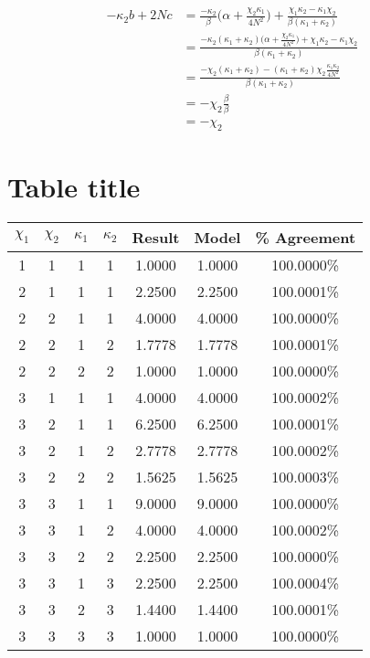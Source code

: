 \documentclass[11pt,a4paper]{article}
\numberwithin{equation}{section}
\begin{document}
\begin{appendices}
	\begin{align*}
	-\kappa_2 b + 2Nc &= \frac{-\kappa_2}{\beta} \Big(\alpha + \frac{\chi_2 \kappa_1}{4N^2} \Big) + \frac{\chi_1 \kappa_2 - \kappa_1 \chi_2}{\beta (\kappa_1+\kappa_2)}&\\
	&= \frac{-\kappa_2 (\kappa_1+\kappa_2) \Big(\alpha + \frac{\chi_2 \kappa_1}{4N^2} \Big) + \chi_1 \kappa_2 - \kappa_1 \chi_2}{\beta (\kappa_1+\kappa_2)}&\\
	&= \frac{-\chi_2(\kappa_1+\kappa_2)- (\kappa_1+\kappa_2)\chi_2 \frac{\kappa_1 \kappa_2}{4N^2}}{\beta (\kappa_1+\kappa_2)}&\\
	&= -\chi_2 \frac{\beta}{\beta}&\\
	&= - \chi_2&
	\end{align*}
	
	\section{Table title} 
	\begin{center}
		\begin{tabular}{cccc|cc|c}
			$\chi_1$ & $\chi_2$ & $\kappa_1$ & $\kappa_2$ & Result & Model & \% Agreement \\
			\hline
			1 & 1 & 1 & 1 & 1.0000 & 1.0000 & 100.0000\% \\
			2 & 1 & 1 & 1 & 2.2500 & 2.2500 & 100.0001\% \\
			2 & 2 & 1 & 1 & 4.0000 & 4.0000 & 100.0000\% \\
			2 & 2 & 1 & 2 & 1.7778 & 1.7778 & 100.0001\% \\
			2 & 2 & 2 & 2 & 1.0000 & 1.0000 & 100.0000\% \\
			3 & 1 & 1 & 1 & 4.0000 & 4.0000 & 100.0002\% \\
			3 & 2 & 1 & 1 & 6.2500 & 6.2500 & 100.0001\% \\
			3 & 2 & 1 & 2 & 2.7778 & 2.7778 & 100.0002\% \\
			3 & 2 & 2 & 2 & 1.5625 & 1.5625 & 100.0003\% \\
			3 & 3 & 1 & 1 & 9.0000 & 9.0000 & 100.0000\% \\
			3 & 3 & 1 & 2 & 4.0000 & 4.0000 & 100.0002\% \\
			3 & 3 & 2 & 2 & 2.2500 & 2.2500 & 100.0000\% \\
			3 & 3 & 1 & 3 & 2.2500 & 2.2500 & 100.0004\% \\
			3 & 3 & 2 & 3 & 1.4400 & 1.4400 & 100.0001\% \\
			3 & 3 & 3 & 3 & 1.0000 & 1.0000 & 100.0000\% \\

\end{tabular}
\end{center}
\end{appendices}
\end{document}
